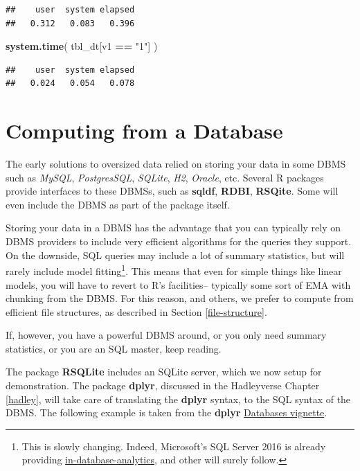 \documentclass[]{book}
\newenvironment{Shaded}{\begin{snugshade}}{\end{snugshade}}
\newcommand{\KeywordTok}[1]{\textcolor[rgb]{0.13,0.29,0.53}{\textbf{#1}}}
\newcommand{\StringTok}[1]{\textcolor[rgb]{0.31,0.60,0.02}{#1}}
\newcommand{\OperatorTok}[1]{\textcolor[rgb]{0.81,0.36,0.00}{\textbf{#1}}}
\newcommand{\NormalTok}[1]{#1}
\theoremstyle{definition}
\theoremstyle{definition}
\theoremstyle{definition}
\theoremstyle{remark}
\begin{document}
\begin{verbatim}
##    user  system elapsed 
##   0.312   0.083   0.396
\end{verbatim}

\begin{Shaded}
\begin{Highlighting}[]
\KeywordTok{system.time}\NormalTok{( }
\NormalTok{  tbl_dt[v1 }\OperatorTok{==}\StringTok{ "1"}\NormalTok{] }
\NormalTok{  )}
\end{Highlighting}
\end{Shaded}

\begin{verbatim}
##    user  system elapsed 
##   0.024   0.054   0.078
\end{verbatim}

\section{Computing from a Database}\label{computing-from-a-database}

The early solutions to oversized data relied on storing your data in
some DBMS such as \emph{MySQL}, \emph{PostgresSQL}, \emph{SQLite},
\emph{H2}, \emph{Oracle}, etc. Several R packages provide interfaces to
these DBMSs, such as \textbf{sqldf}, \textbf{RDBI}, \textbf{RSQite}.
Some will even include the DBMS as part of the package itself.

Storing your data in a DBMS has the advantage that you can typically
rely on DBMS providers to include very efficient algorithms for the
queries they support. On the downside, SQL queries may include a lot of
summary statistics, but will rarely include model fitting\footnote{This
  is slowly changing. Indeed, Microsoft's SQL Server 2016 is already
  providing
  \href{https://blogs.technet.microsoft.com/dataplatforminsider/2016/03/29/in-database-advanced-analytics-with-r-in-sql-server-2016/}{in-database-analytics},
  and other will surely follow.}. This means that even for simple things
like linear models, you will have to revert to R's facilities--
typically some sort of EMA with chunking from the DBMS. For this reason,
and others, we prefer to compute from efficient file structures, as
described in Section \ref{file-structure}.

If, however, you have a powerful DBMS around, or you only need summary
statistics, or you are an SQL master, keep reading.

The package \textbf{RSQLite} includes an SQLite server, which we now
setup for demonstration. The package \textbf{dplyr}, discussed in the
Hadleyverse Chapter \ref{hadley}, will take care of translating the
\textbf{dplyr} syntax, to the SQL syntax of the DBMS. The following
example is taken from the \textbf{dplyr}
\href{https://cran.r-project.org/web/packages/dplyr/vignettes/databases.html}{Databases
vignette}.
\end{document}
